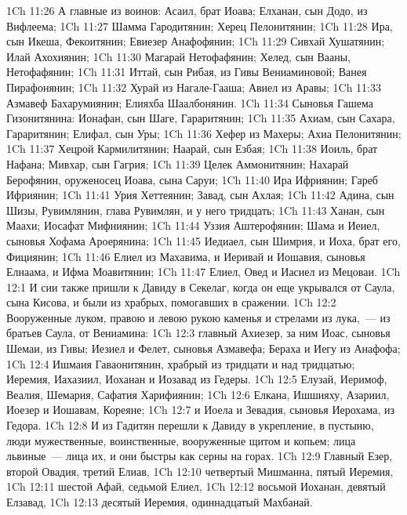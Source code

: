 \rsbpar\vs 1Ch 11:26 А главные из воинов: Асаил, брат Иоава; Елханан, сын Додо, из Вифлеема;
\vs 1Ch 11:27 Шамма Гародитянин; Херец Пелонитянин;
\vs 1Ch 11:28 Ира, сын Икеша, Фекоитянин; Евиезер Анафофянин;
\vs 1Ch 11:29 Сивхай Хушатянин; Илай Ахохиянин;
\vs 1Ch 11:30 Магарай Нетофафянин; Хелед, сын Вааны, Нетофафянин;
\vs 1Ch 11:31 Иттай, сын Рибая, из Гивы Вениаминовой; Ванея Пирафонянин;
\vs 1Ch 11:32 Хурай из Нагале-Гааша; Авиел из Аравы;
\vs 1Ch 11:33 Азмавеф Бахарумиянин; Елияхба Шаалбонянин.
\vs 1Ch 11:34 Сыновья Гашема Гизонитянина: Ионафан, сын Шаге, Гараритянин;
\vs 1Ch 11:35 Ахиам, сын Сахара, Гараритянин; Елифал, сын Уры;
\vs 1Ch 11:36 Хефер из Махеры; Ахиа Пелонитянин;
\vs 1Ch 11:37 Хецрой Кармилитянин; Наарай, сын Езбая;
\vs 1Ch 11:38 Иоиль, брат Нафана; Мивхар, сын Гагрия;
\vs 1Ch 11:39 Целек Аммонитянин; Нахарай Берофянин, оруженосец Иоава, сына Саруи;
\vs 1Ch 11:40 Ира Ифриянин; Гареб Ифриянин;
\vs 1Ch 11:41 Урия Хеттеянин; Завад, сын Ахлая;
\vs 1Ch 11:42 Адина, сын Шизы, Рувимлянин, глава Рувимлян, и у него  тридцать;
\vs 1Ch 11:43 Ханан, сын Маахи; Иосафат Мифниянин;
\vs 1Ch 11:44 Уззия Аштерофянин; Шама и Иеиел, сыновья Хофама Ароерянина;
\vs 1Ch 11:45 Иедиаел, сын Шимрия, и Иоха, брат его, Фициянин;
\vs 1Ch 11:46 Елиел из Махавима, и Иеривай и Иошавия, сыновья Елнаама, и Ифма Моавитянин;
\vs 1Ch 11:47 Елиел, Овед и Иасиел из Мецоваи.
\vs 1Ch 12:1 И сии также пришли к Давиду в Секелаг, когда он еще укрывался от Саула, сына Кисова, и были из храбрых, помогавших в сражении.
\vs 1Ch 12:2 Вооруженные луком, правою и левою рукою  каменья и  стрелами из лука,~--- из братьев Саула, от Вениамина:
\vs 1Ch 12:3 главный Ахиезер, за ним Иоас, сыновья Шемаи, из Гивы; Иезиел и Фелет, сыновья Азмавефа; Бераха и Иегу из Анафофа;
\vs 1Ch 12:4 Ишмаия Гаваонитянин, храбрый из тридцати и  над тридцатью; Иеремия, Иахазиил, Иоханан и Иозавад из Гедеры.
\vs 1Ch 12:5 Елузай, Иеримоф, Веалия, Шемария, Сафатия Харифиянин;
\vs 1Ch 12:6 Елкана, Ишшияху, Азариил, Иоезер и Иошавам, Кореяне;
\vs 1Ch 12:7 и Иоела и Зевадия, сыновья Иерохама, из Гедора.
\rsbpar\vs 1Ch 12:8 И из Гадитян перешли к Давиду в укрепление, в пустыню, люди мужественные, воинственные, вооруженные щитом и копьем; лица львиные~--- лица их, и они быстры как серны на горах.
\vs 1Ch 12:9 Главный Езер, второй Овадия, третий Елиав,
\vs 1Ch 12:10 четвертый Мишманна, пятый Иеремия,
\vs 1Ch 12:11 шестой Афай, седьмой Елиел,
\vs 1Ch 12:12 восьмой Иоханан, девятый Елзавад,
\vs 1Ch 12:13 десятый Иеремия, одиннадцатый Махбанай.
